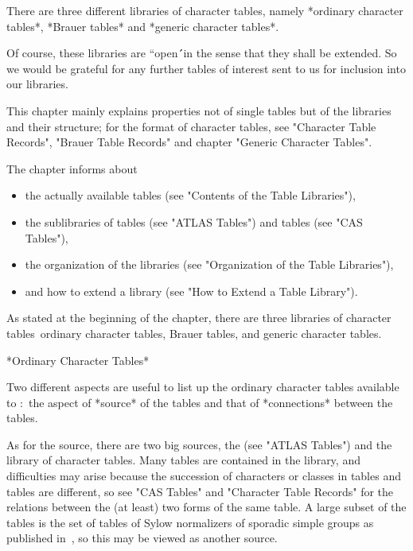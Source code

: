 There are three different libraries of character tables, namely *ordinary
character tables*, *Brauer tables* and *generic character tables*.

Of course,  these libraries are ``open\'\'\  in the sense that they shall
be extended. So we would  be grateful for  any further tables of interest
sent to us for inclusion into our libraries.

This chapter mainly explains  properties not of  single tables but of the
libraries and their  structure; for the  format of character tables,  see
"Character Table  Records", "Brauer  Table Records" and  chapter "Generic
Character Tables".

The chapter informs about
\begin{itemize}
\item the   actually  available  tables   (see  "Contents  of  the  Table
      Libraries"),
\item the sublibraries of {\ATLAS} tables (see "ATLAS Tables") and {\CAS}
      tables (see "CAS Tables"),
\item the  organization of the libraries  (see "Organization of the Table
      Libraries"),
\item and how to extend a library  (see "How to Extend a Table Library").
\end{itemize}

%
%

As stated at  the beginning of the chapter,  there are three libraries of
character tables\:\ ordinary character tables, Brauer tables, and generic
character tables.

*Ordinary Character Tables*

Two different aspects are useful to list up the ordinary character tables
available  to {\GAP}:\ the aspect  of *source* of  the tables and that of
*connections* between the tables.

As  for the source,  there are two big sources,  the {\ATLAS} (see "ATLAS
Tables") and the  {\CAS} library   of  character tables.   Many  {\ATLAS}
tables are contained in the   {\CAS} library, and difficulties may  arise
because  the  succession of characters  or  classes in  {\CAS} tables and
{\ATLAS} tables are  different, so see "CAS  Tables" and "Character Table
Records" for the relations between  the (at least) two  forms of the same
table.  A large subset of the {\CAS} tables is the set of tables of Sylow
normalizers of  sporadic simple groups  as  published in~\cite{Ost86}, so
this may be viewed as another source.

